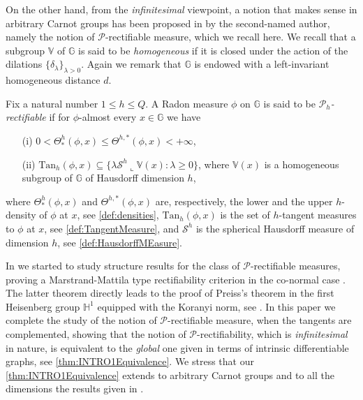 \documentclass[10pt, a4paper,
oneside, headinclude,footinclude]{scrartcl}
\begin{document}
On the other hand, from the \textit{infinitesimal} viewpoint, a notion that makes sense in arbitrary Carnot groups has been proposed in \cite{MarstrandMattila20} by the second-named author, namely the notion of $\mathscr{P}$-rectifiable measure, which we recall here. We recall that a subgroup $\mathbb V$ of $\mathbb G$ is said to be \textit{homogeneous} if it is closed under the action of the dilations $\{\delta_\lambda\}_{\lambda>0}$. Again we remark that $\mathbb G$ is endowed with a left-invariant homogeneous distance $d$.

\begin{definizione}\label{def:PhRectifiableMeasureINTRO}
Fix a natural number $1\leq h\leq Q$. A Radon measure $\phi$ on $\mathbb G$ is said to be {\em $\mathscr{P}_h$-rectifiable} if for $\phi$-almost every $x\in \mathbb{G}$ we have \begin{itemize}
    \item[(i)]$0<\Theta^h_*(\phi,x)\leq\Theta^{h,*}(\phi,x)<+\infty$,
    \item[(\hypertarget{due}{ii})]$\mathrm{Tan}_h(\phi,x) \subseteq \{\lambda\mathcal{S}^h\llcorner \mathbb V(x):\lambda\geq 0\}$, where $\mathbb V(x)$ is a homogeneous subgroup of $\mathbb G$ of Hausdorff dimension $h$,
\end{itemize}
where $\Theta^h_*(\phi,x)$ and $\Theta^{h,*}(\phi,x)$ are, respectively, the lower and the upper $h$-density of $\phi$ at $x$, see \cref{def:densities}, $\mathrm{Tan}_h(\phi,x)$ is the set of $h$-tangent measures to $\phi$ at $x$, see \cref{def:TangentMeasure}, and $\mathcal{S}^h$ is the spherical Hausdorff measure of dimension $h$, see \cref{def:HausdorffMEasure}.
\end{definizione}

In \cite{antonelli2020rectifiable} we started to study structure results for the class of $\mathscr{P}$-rectifiable measures, proving a Marstrand-Mattila type rectifiability criterion in the co-normal case \cite[Theorem 1.3]{antonelli2020rectifiable}. The latter theorem directly leads to the proof of Preiss's theorem in the first Heisenberg group $\mathbb H^1$ equipped with the Koranyi norm, see \cite[Theorem 1.4]{antonelli2020rectifiable}. In this paper we complete the study of the notion of $\mathscr{P}$-rectifiable measure, when the tangents are complemented, showing that the notion of $\mathscr{P}$-rectifiability, which is \textit{infinitesimal} in nature, is equivalent to the \textit{global} one given in terms of intrinsic differentiable graphs, see \cref{thm:INTRO1Equivalence}. We stress that our \cref{thm:INTRO1Equivalence} extends to arbitrary Carnot groups and to all the dimensions the results given in \cite{MatSerSC}.
\end{document}
